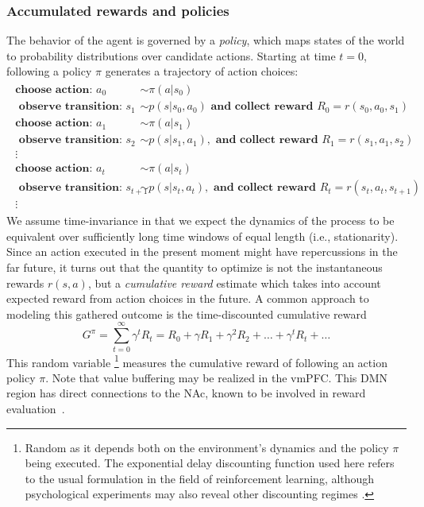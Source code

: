 \documentclass[10pt,letterpaper]{article}
\begin{document}
\subsubsection{Accumulated rewards and policies}
The behavior of the agent is governed by a \textit{policy}, which maps states of the world
to probability distributions over candidate actions.
Starting at time $t=0$,
following a policy $\pi$ generates a trajectory of action choices:
\begin{eqnarray*}
  \begin{split}
    \textbf{choose action: }a_0 &\sim \pi(a|s_0)\\
    \textbf{ observe transition: }s_1 &\sim p(s|s_0,a_0)\textbf{ and collect
      reward }R_0 = r(s_0, a_0, s_1)\\
    \textbf{choose action: }a_1 &\sim \pi(a|s_1)\\
    \textbf{ observe transition: }s_2 &\sim p(s|s_1,a_1), \textbf{ and collect
      reward }R_1 = r(s_1, a_1,s_2)\\
    \vdots\\
    \textbf{choose action: }a_{t} &\sim \pi(a|s_{t})\\
    \textbf{ observe transition: }s_{t+1} &\sim p(s|s_{t},a_{t}), \textbf{ and
      collect reward }R_{t} = r(s_{t}, a_{t},s_{t+1})\\
    \vdots
  \end{split}
\end{eqnarray*}
We assume time-invariance
in that we expect the dynamics of the process
to be equivalent over sufficiently long time windows of equal length (i.e., stationarity).
Since an action executed in the present moment might have repercussions in the
far future, it turns out that the quantity to optimize is not the instantaneous
rewards $r(s, a)$, but a \textit{cumulative reward} estimate which takes into
account expected reward from action choices in the future. A common approach to
modeling this gathered outcome is the time-discounted cumulative reward%
\begin{equation}
  \label{eq:cumr}
  G^\pi = \sum_{t=0}^{\infty}\gamma^{t}R_t = R_0 + \gamma R_1 + \gamma^2 R_2 + \ldots + \gamma^tR_t + \ldots
\end{equation}
This random variable
  \footnote{Random as it depends both on the environment's dynamics and the
  policy $\pi$ being executed. The exponential delay discounting function used
  here refers to the usual formulation in the field of reinforcement learning,
  although psychological experiments may also reveal other discounting regimes
  \citep{green2004discounting}.}
measures the cumulative reward of
following an action policy $\pi$.
%
Note that value buffering may be realized in the vmPFC.
This DMN region has direct connections to the NAc, known to be involved in
reward evaluation~\citep{carlezon2009}.
\end{document}
